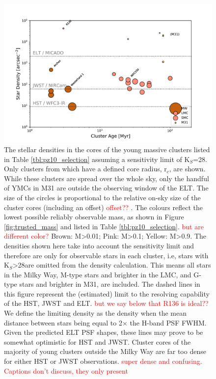\begin{figure}

    \centering
    \includegraphics[width=\textwidth]{images/star_density_vs_age.pdf}


    \caption{
    The stellar densities in the cores of the young massive clusters listed in Table \ref{tbl:pz10_selection} assuming a sensitivity limit of K$_S$=28\m. Only clusters from \citet{portegies2010} which have a defined core radius, r$_c$, are shown. While these clusters are spread over the whole sky, only the handful of YMCs in M31 are outside the observing window of the ELT. The size of the circles is proportional to the relative on-sky size of the cluster cores (including an offset) \textcolor{red}{offset?? }. 
    The colours reflect the lowest possible reliably observable mass, as shown in Figure \ref{fig:trusted_mass} and listed in Table \ref{tbl:pz10_selection}. \textcolor{red}{but are different color?}
    Brown: M\textgreater0.01\msun; Pink: M\textgreater0.1\msun; Yellow: M\textgreater0.9\msun. 
    The densities shown here take into account the sensitivity limit and therefore are only for observable stars in each cluster, i.e, stars with K$_S$\textgreater28\m are omitted from the density calculation.  This means all stars in the Milky Way, M-type stars and brighter in the LMC, and G-type stars and brighter in M31, are included. 
    The dashed lines in this figure represent the (estimated) limit to the resolving capability of the HST, JWST and ELT. \textcolor{red}{but we say below that R136 is ideal??}
    We define the limiting density as the density when the mean distance between stars being equal to 2$\times$ the H-band PSF FWHM.
    Given the predicted ELT PSF shapes, these lines may prove to be somewhat optimistic for HST and JWST.  Cluster cores of the majority of young clusters outside the Milky Way are far too dense for either HST or JWST observations.   \textcolor{red}{super dense and confusing. Captions don't discuss, they only present}}
    
    \label{fig:star_density_vs_age}
    
\end{figure}


